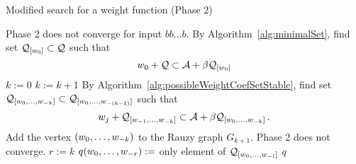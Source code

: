 \begin{algorithm}
  \caption{Modified search for a weight function (Phase 2)}
    \label{alg:weightFunction_modified}
  \begin{algorithmic}[1]
    		\RETURN Phase 2 does not converge for input $bb\dots b$.
    	\ENDIF
    \ENDFOR
        \STATE By Algorithm~\ref{alg:minimalSet}, find set $\mathcal{Q}_{[w_0]} \subset \mathcal{Q}$ such that
          $$
          w_0 + \mathcal{Q} \subset \mathcal{A} + \beta \mathcal{Q}_{[w_0]}
          $$\vspace{-20pt}
    \ENDFOR
    \STATE $k:=0$
        \STATE $k:= k +1$
            \STATE By Algorithm~\ref{alg:possibleWeightCoefSetStable}, find set $\mathcal{Q}_{[w_{0}, \dots, w_{-k}]} \subset \mathcal{Q}_{[w_{0}, \dots, w_{-(k-1)}]}$ such that
              $$
              w_j + \mathcal{Q}_{[w_{-1}, \dots, w_{-k}]} \subset \mathcal{A} + \beta \mathcal{Q}_{[w_{0}, \dots, w_{-k}]}\,.
              $$\vspace{-20pt}
              	\STATE Add the vertex $(w_{0}, \dots, w_{-k})$ to the Rauzy graph $G_{k+1}$.
              		\RETURN Phase 2 does not converge.
              	\ENDIF
              \ENDIF
        \ENDFOR  
    \ENDWHILE  
    \STATE $r:= k$ 
	    		\STATE $q(w_{0}, \dots, w_{-r}):=$ only element of $\mathcal{Q}_{[w_{0}, \dots, w_{-l}]}$
	    	\ENDFOR
	    \ENDFOR
	\ENDFOR
    \RETURN $q$
  \end{algorithmic}
\end{algorithm}







